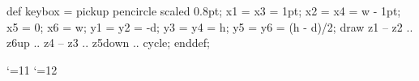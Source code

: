 
\MTcode
def keybox =
 pickup pencircle scaled 0.8pt;
 x1 = x3 = 1pt; x2 = x4 = w - 1pt; x5 = 0; x6 = w;
 y1 = y2 = -d; y3 = y4 = h; y5 = y6 = (h - d)/2;
 draw z1 -- z2 .. z6{up} .. z4 -- z3 .. z5{down} .. cycle;
enddef;

\catcode`\@=11
\def\defkey#1#2{\setbox0=\hbox{\sf#2}\count@=\MTn@
 \dimen0=\wd0\advance\dimen0 by 2pt
 \dimen2=\ht0\advance\dimen2 by 1pt
 \dimen4=\dp0\advance\dimen4 by 1pt
 \MTbeginchar(\the\dimen0,\the\dimen2,\the\dimen4);%
  \MTline{ keybox;}%
 \MTendchar;%
 \edef#1{\ifMTmf
  \rlap{\kern1pt\sf#2}{\MTfont\char\the\count@}%
 \else
  \ifcase\pdfoutput \special{psfile=auxiliar.\number\count@}%
  \else \ifMTf@le\noexpand\MPtoPDF{auxiliar.\number\count@}\fi
  \fi
  \kern1pt{\sf#2}\kern1pt
 \fi}}
\catcode`\@=12

\def\makekey#1{\expandafter\defkey\csname#1\endcsname{#1}}
